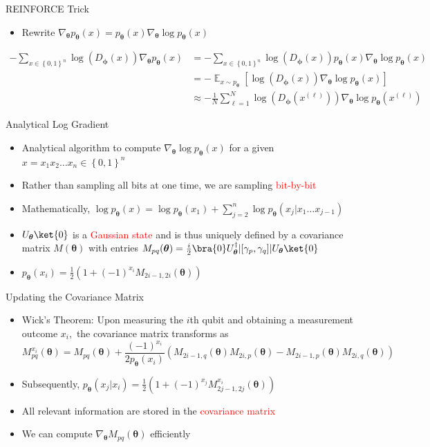 \documentclass[xcolor=dvipsnames]{beamer}
\DeclareMathOperator*{\E}{\mathbb{E}}
\newcommand{\set}[1]{\left\{#1\right\}}
\begin{document}
\begin{frame}{REINFORCE Trick}
  \begin{itemize}
    \item Rewrite $\nabla_{\bm{\theta}}p_{\bm{\theta}}(x)=p_{\bm{\theta}}(x)\nabla_{\bm{\theta}}\log p_{\bm{\theta}}(x)$
  \end{itemize}
  \begin{align*}
    -\sum_{x\in\set{0,1}^n}\log(D_{\bm{\phi}}(x))\nabla_{\bm{\theta}} p_{\bm{\theta}}(x)&=-\sum_{x\in\set{0,1}^n}\log(D_{\bm{\phi}}(x))p_{\bm{\theta}}(x)\nabla_{\bm{\theta}}\log p_{\bm{\theta}}(x)\\
    &=-\E_{x\sim p_{\bm{\theta}}}\left[\log(D_{\bm{\phi}}(x))\nabla_{\bm{\theta}}\log p_{\bm{\theta}}(x)\right]\\
    &\approx -\frac{1}{N}\sum_{\ell=1}^N\log(D_{\bm{\phi}}(x^{(\ell)}))\nabla_{\bm{\theta}}\log p_{\bm{\theta}}(x^{(\ell)})
  \end{align*}
\end{frame}

\begin{frame}{Analytical Log Gradient}
  \begin{itemize}
    \item Analytical algorithm to compute $\nabla_{\bm{\theta}}\log p_{\bm{\theta}}(x)$ for a given $x=x_1x_2\ldots x_n\in\set{0,1}^n$
    \item Rather than sampling all bits at one time, we are sampling \textcolor{red}{bit-by-bit}
    \item Mathematically, $\displaystyle\log p_{\bm{\theta}}(x)=\log p_{\bm{\theta}}(x_1)+\sum_{j=2}^n\log p_{\bm{\theta}}(x_j|x_1\ldots x_{j-1})$
    \item $U_{\bm{\theta}}\ket{0}$ is a \textcolor{red}{Gaussian state} and is thus uniquely defined by a covariance matrix $M(\bm{\theta})$ with entries $M_{pq}(\bm{\theta})=\frac{i}{2}\bra{0}U_{\bm{\theta}}^\dagger|[\gamma_p,\gamma_q]|U_{\bm{\theta}}\ket{0}$
    \item $p_{\bm{\theta}}(x_i)=\frac12(1+(-1)^{x_i}M_{2i-1,2i}({\bm{\theta}}))$
  \end{itemize}
\end{frame}

\begin{frame}{Updating the Covariance Matrix}
  \begin{itemize}
    \item Wick's Theorem: Upon measuring the $i$th qubit and obtaining a measurement outcome $x_i,$ the covariance matrix transforms as
    \[M_{pq}^{x_i}(\bm{\theta})=M_{pq}(\bm{\theta})+\frac{(-1)^{x_i}}{2p_{\bm{\theta}}(x_i)}(M_{2i-1,q}(\bm{\theta})M_{2i,p}(\bm{\theta})-M_{2i-1,p}(\bm{\theta})M_{2i,q}(\bm{\theta}))\]
    \item Subsequently, $p_{\bm{\theta}}(x_j|x_i)=\frac12(1+(-1)^{x_j}M_{2j-1,2j}^{x_i}(\bm{\theta}))$
    \item All relevant information are stored in the \textcolor{red}{covariance matrix}
    \item We can compute $\nabla_{{\bm{\theta}}}M_{pq}({\bm{\theta}})$ efficiently
  \end{itemize}
\end{frame}
\end{document}
